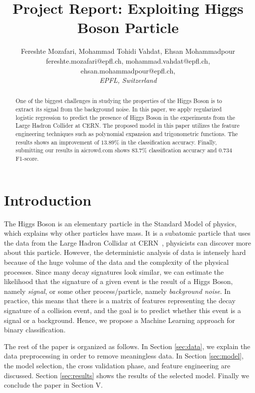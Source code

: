 \documentclass[8pt,conference,compsocconf]{IEEEtran}
\begin{document}
\title{Project Report: Exploiting Higgs Boson Particle}

\author{
 Fereshte Mozafari, Mohammad Tohidi Vahdat, Ehsan Mohammadpour\\
 fereshte.mozafari@epfl.ch, mohammad.vahdat@epfl.ch, ehsan.mohammadpour@epfl.ch, \\
  \textit{EPFL, Switzerland}
}

\maketitle

\begin{abstract}
  One of the biggest challenges in studying the properties of the Higgs Boson is to extract its signal from the background noise. In this paper, we apply regularized logistic regression to predict the presence of Higgs Boson in the experiments from the Large Hadron Collider at CERN. The proposed model in this paper utilizes the feature engineering techniques such as polynomial expansion and trigonometric functions. The results shows an improvement of $13.89$\% in the classification accuracy. Finally, submitting our results in aicrowd.com shows $83.7$\% classification accuracy and $0.734$ F1-score.
\end{abstract}
\section{Introduction}
The Higgs Boson is an elementary particle in the Standard Model of physics, which explains why other particles have mass. It is a subatomic particle that uses the data from the Large Hadron Collidar at CERN~\cite{aad2012observation}, physicists can discover more about this particle. However, the deterministic analysis of data is intensely hard because of the huge volume of the data and the complexity of the physical processes. Since many decay signatures look similar, we can estimate the likelihood that the signature of a given event is the result of a Higgs Boson, namely \textit{signal}, or some other process/particle, namely \textit{background noise}. In practice, this means that there is a matrix of features representing the decay signature of a collision event, and the goal is to predict whether this event is a signal or a background. Hence, we propose a Machine Learning approach for binary classification. \par 
The rest of the paper is organized as follows. In Section \ref{sec:data}, we explain the data preprocessing in order to remove meaningless data. In Section \ref{sec:model}, the model selection, the cross validation phase, and feature engineering are discussed. Section \ref{sec:results} shows the results of the selected model. Finally we conclude the paper in Section V.
\end{document}
